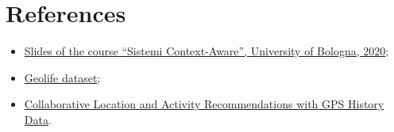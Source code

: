 \documentclass[../main]{subfiles}
\begin{document}
\section{References}
\label{s:references}

\begin{itemize}
    \item \href{https://virtuale.unibo.it/course/view.php?id=18236}{Slides of the course ``Sistemi Context-Aware'', University of Bologna, 2020};
    \item \label{ref:geolife}\href{https://www.microsoft.com/en-us/download/details.aspx?id=52367&from=https%3A%2F%2Fresearch.microsoft.com%2Fen-us%2Fdownloads%2Fb16d359d-d164-469e-9fd4-daa38f2b2e13%2F}{Geolife dataset};
    \item \label{ref:clar}\href{https://home.cse.ust.hk/~qyang/Docs/2010/www10_clar_2.pdf}{Collaborative Location and Activity Recommendations with GPS History Data}.
\end{itemize}
\end{document}
